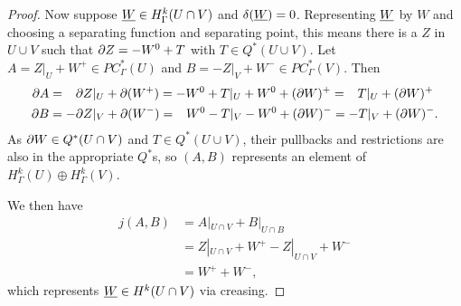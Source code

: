 \begin{proof}
	Now suppose $\underline{W} \in H^k_\Gamma(U \cap V)$ and $\delta(\underline{W}) = 0$. Representing $\underline{W}$ by $W$ and choosing a separating function and separating point, this means there is a $Z$ in $U \cup V$ such that $\partial Z = -W^0+T$ with $T \in Q^*(U \cup V)$. Let $A = Z|_U+ W^+ \in PC^*_\Gamma(U)$ and $B = -Z|_V +W^- \in PC^*_\Gamma(V)$. Then
	\begin{align*}
		\partial A& = \phantom{-}\partial Z|_U+ \partial( W^+) = -W^0+T|_U +W^0+(\partial W)^{+} = \phantom{-}T|_U+(\partial W)^{+}\\
		\partial B& = -\partial Z|_V+ \partial (W^-) = \phantom{-}W^0-T|_V -W^0+(\partial W)^{-} = -T|_V+(\partial W)^{-}.
	\end{align*}
	As $\partial W \in Q^*(U \cap V)$ and $T \in Q^*(U \cup V)$, their pullbacks and restrictions are also in the appropriate $Q^*$s, so $(A,B)$ represents an element of $H^k_\Gamma(U) \oplus H^k_\Gamma(V)$.

	We then have
	\begin{align*}
		j(A,B)& = A|_{U \cap V}+B|_{U \cap B}\\
		& = Z|_{U \cap V}+ W^+ - Z|_{U \cap V} +W^-\\
		& = W^++W^-,
	\end{align*}
	which represents $\underline{W} \in H^k(U \cap V)$ via creasing.
\end{proof}

